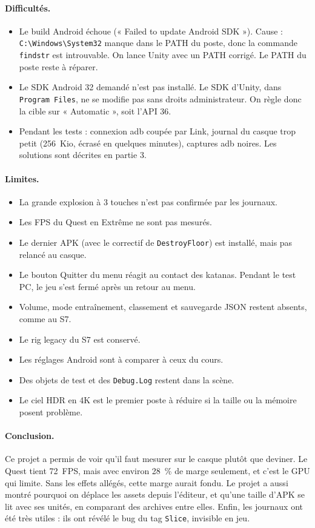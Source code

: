 \documentclass[11pt,a4paper]{article}
\newcommand{\fichier}[1]{\texttt{\small #1}}
\begin{document}
\paragraph{Difficultés.}
\begin{itemize}
\item Le build Android échoue (« Failed to update Android SDK »). Cause :
  \fichier{C:\textbackslash Windows\textbackslash System32} manque dans le PATH du poste, donc
  la commande \texttt{findstr} est introuvable. On lance Unity avec un PATH corrigé. Le PATH du poste
  reste à réparer.
\item Le SDK Android 32 demandé n'est pas installé. Le SDK d'Unity, dans \fichier{Program Files}, ne
  se modifie pas sans droits administrateur. On règle donc la cible sur « Automatic », soit l'API 36.
\item Pendant les tests : connexion adb coupée par Link, journal du casque trop petit (256~Kio, écrasé
  en quelques minutes), captures adb noires. Les solutions sont décrites en partie 3.
\end{itemize}

\paragraph{Limites.}
\begin{itemize}
\item La grande explosion à 3 touches n'est pas confirmée par les journaux.
\item Les FPS du Quest en Extrême ne sont pas mesurés.
\item Le dernier APK (avec le correctif de \texttt{DestroyFloor}) est installé, mais pas relancé au casque.
\item Le bouton Quitter du menu réagit au contact des katanas. Pendant le test PC, le jeu s'est fermé
  après un retour au menu.
\item Volume, mode entraînement, classement et sauvegarde JSON restent absents, comme au S7.
\item Le rig legacy du S7 est conservé.
\item Les réglages Android sont à comparer à ceux du cours.
\item Des objets de test et des \texttt{Debug.Log} restent dans la scène.
\item Le ciel HDR en 4K est le premier poste à réduire si la taille ou la mémoire posent problème.
\end{itemize}

\paragraph{Conclusion.} Ce projet a permis de voir qu'il faut mesurer sur le casque plutôt que
deviner. Le Quest tient 72~FPS, mais avec environ 28~\% de marge seulement, et c'est le GPU qui
limite. Sans les effets allégés, cette marge aurait fondu. Le projet a aussi montré pourquoi on
déplace les assets depuis l'éditeur, et qu'une taille d'APK se lit avec ses unités, en comparant des
archives entre elles. Enfin, les journaux ont été très utiles : ils ont révélé le bug du tag
\texttt{Slice}, invisible en jeu.
\end{document}
